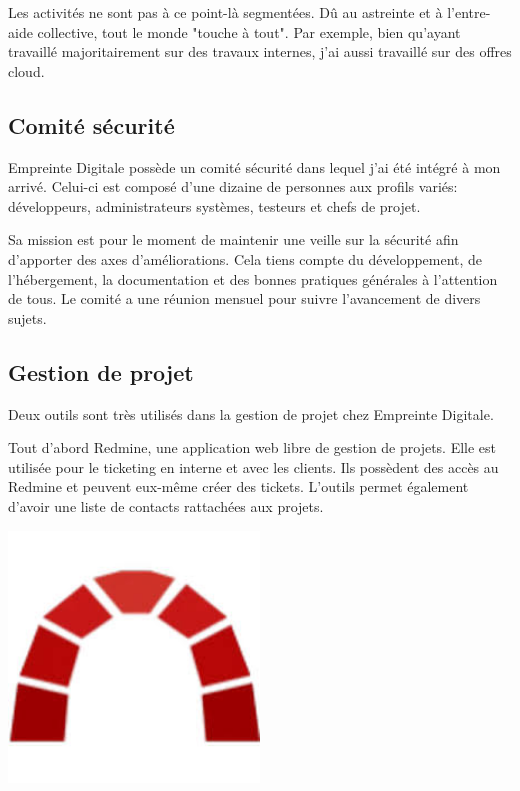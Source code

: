 \documentclass[12pt, a4paper, twoside]{article}
\begin{document}
Les activités ne sont pas à ce point-là segmentées. 
Dû au astreinte et à l'entre-aide collective, tout le monde "touche à tout". 
Par exemple, bien qu'ayant travaillé majoritairement sur des travaux internes, j'ai aussi travaillé sur des offres cloud.

\subsection{Comité sécurité}
Empreinte Digitale possède un comité sécurité dans lequel j'ai été intégré à mon arrivé.
Celui-ci est composé d'une dizaine de personnes aux profils variés: développeurs, administrateurs systèmes, testeurs et chefs de projet.

Sa mission est pour le moment de maintenir une veille sur la sécurité afin d'apporter des axes d'améliorations. 
Cela tiens compte du développement, de l'hébergement, la documentation et des bonnes pratiques générales à l'attention de tous. 
Le comité a une réunion mensuel pour suivre l'avancement de divers sujets.

\subsection{Gestion de projet}
Deux outils sont très utilisés dans la gestion de projet chez Empreinte Digitale. \\

\noindent%
\begin{minipage}{.7\textwidth}%
Tout d'abord \gls{Redmine}, une application web libre de gestion de projets.
Elle est utilisée pour le ticketing en interne et avec les clients.
Ils possèdent des accès au \gls{Redmine} et peuvent eux-même créer des tickets.
L'outils permet également d'avoir une liste de contacts rattachées aux projets. \\
\end{minipage}%
\hfill
\begin{minipage}{.3\textwidth}%
\begin{center}
\includegraphics[width=0.5\textwidth]{src/logo_redmine.jpeg}
\end{center}
\end{minipage}%
\end{document}
